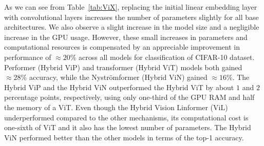 \documentclass{article}
\begin{document}
\begin{table*}[h]
\centering
{}
\caption{Test accuracy and various requirements of models compared on the Tiny ImageNet dataset for a batch size of 64}
\label{tab:tiny}
\end{table*}
As we can see from Table~\ref{tab:ViX}, replacing the initial linear embedding layer with convolutional layers increases the number of parameters slightly for all base architectures. We also observe a slight increase in the model size and a negligible increase in the GPU usage. However, these small increases in parameters and computational resources is compensated by an appreciable improvement in performance of $\approx 20 \%$ across all models for classification of CIFAR-10 dataset. Performer (Hybrid ViP) and transformer (Hybrid ViT) models both gained $\approx 28 \%$ accuracy, while the Nyströmformer (Hybrid ViN) gained $\approx 16 \%$. The Hybrid ViP and the Hybrid ViN outperformed the Hybrid ViT by about $1$ and $2$ percentage points, respectively, using only one-third of the GPU RAM and half the memory of a ViT. Even though the Hybrid Vision Linformer (ViL) underperformed compared to the other mechanisms, its computational cost is one-sixth of ViT and it also has the lowest number of parameters. The Hybrid ViN performed better than the other models in terms of the top-1 accuracy. 
\end{document}
